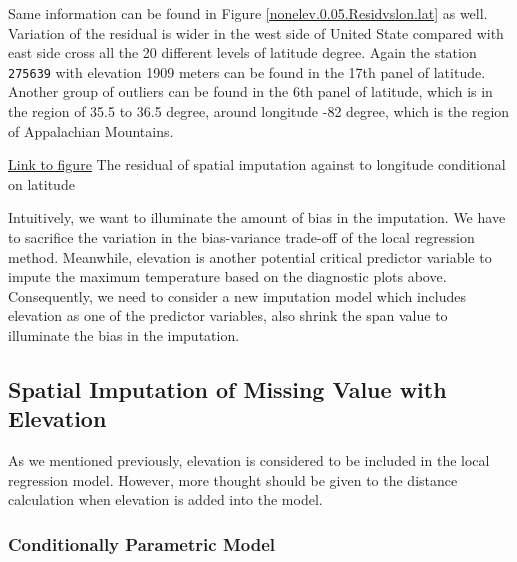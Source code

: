 Same information can be found in Figure 
\href{../plots/a1950/spaimpute/nonelev/span0.05/a1950.spaResid.vs.lon.lat.pdf}
{\ref*{nonelev.0.05.Residvslon.lat}} as well. Variation of the residual is wider
in the west side of United State compared with east side cross all the 20 different
levels of latitude degree. Again the station \texttt{275639} with elevation 1909 
meters can be found in the 17th panel of latitude. Another group of outliers can 
be found in the 6th panel of latitude, which is in the region of 35.5 to 36.5 degree, 
around longitude -82 degree, which is the region of Appalachian Mountains.

\begin{framed}
\begin{center}
  \href{../plots/a1950/spaimpute/nonelev/span0.05/a1950.spaResid.vs.lon.lat.pdf}
  {Link to figure}
  {The residual of spatial imputation against to longitude conditional on latitude}
  \label{nonelev.0.05.Residvslon.lat}
\end{center}
\end{framed}

Intuitively, we want to illuminate the amount of bias in the imputation. We have 
to sacrifice the variation in the bias-variance trade-off of the local regression
method. Meanwhile, elevation is another potential critical predictor variable to
impute the maximum temperature based on the diagnostic plots above.
Consequently, we need to consider a new imputation model which includes elevation as
one of the predictor variables, also shrink the span value to illuminate the 
bias in the imputation.

\subsection{Spatial Imputation of Missing Value with Elevation}

As we mentioned previously, elevation is considered to be included in the local
regression model. However, more thought should be given to the distance calculation
when elevation is added into the model.


\subsubsection{Conditionally Parametric Model}

